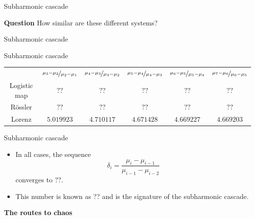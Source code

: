 \documentclass[usenames,dvipsnames,svgnames,10pt,aspectratio=169]{beamer}
\begin{document}
\begin{frame}[t, c]{Subharmonic cascade}{}
	\begin{block}{\centering \textbf{Question}}
		\centering
		How similar are these different systems?
	\end{block}
\end{frame}

\begin{frame}[t, c]{Subharmonic cascade}{}

\end{frame}

\begin{frame}[t, c]{Subharmonic cascade}{}
		\begin{center}
			\begin{tabular}{cccccc}
				~ & $\nicefrac{\mu_3-\mu_2}{\mu_2 - \mu_1}$ &$\nicefrac{\mu_4-\mu_3}{\mu_3 - \mu_2}$ &$\nicefrac{\mu_5-\mu_4}{\mu_4 - \mu_3}$ &$\nicefrac{\mu_6-\mu_5}{\mu_5 - \mu_4}$ &$\nicefrac{\mu_7-\mu_6}{\mu_6 - \mu_5}$ \\
				Logistic map & $??$ & $??$ & $??$ & $??$ & $??$ \\
				R\"ossler & $??$ & $??$ & $??$ & $??$ & $??$ \\
				Lorenz & $5.019923$ & $4.710117$ & $4.671428$ & $4.669227$ & $4.669203$
			\end{tabular}
		\end{center}

		\vspace{1cm}
\end{frame}

\begin{frame}[t, c]{Subharmonic cascade}{}
	\begin{itemize}
		\item In all cases, the sequence
		$$\delta_i = \displaystyle \frac{\mu_{i} - \mu_{i-1}}{\mu_{i-1} - \mu_{i-2}}$$
		converges to $??$.

		\bigskip

		\item This number is known as ?? and is the signature of the subharmonic cascade.
	\end{itemize}

	\vspace{1cm}
\end{frame}

\begin{frame}[t, c]{}
	\centering
	\vspace{1cm}

	{\Large \textbf{The routes to chaos}}

	\bigskip

	{}

\end{frame}
\end{document}
